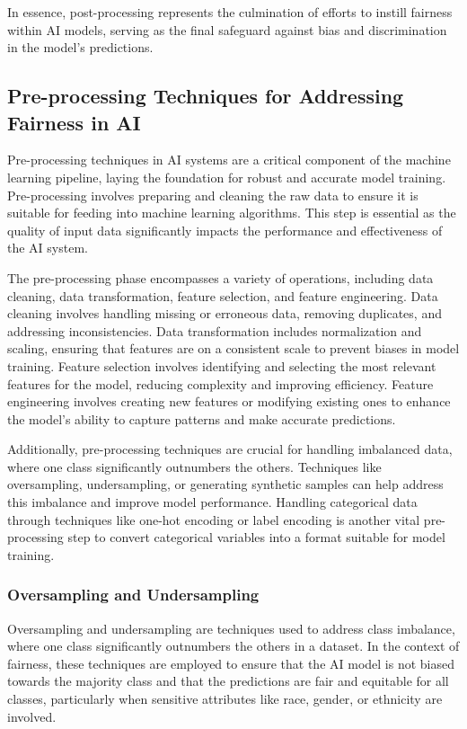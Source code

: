 \documentclass[12pt,a4paper,openright,twoside]{book}
\begin{document}
In essence, post-processing represents the culmination of efforts to instill fairness within AI models, serving as the final safeguard against bias and discrimination in the model's predictions.

\subsection{Pre-processing Techniques for Addressing Fairness in AI}

Pre-processing techniques in AI systems are a critical component of the machine learning pipeline, laying the foundation for robust and accurate model training. Pre-processing involves preparing and cleaning the raw data to ensure it is suitable for feeding into machine learning algorithms. This step is essential as the quality of input data significantly impacts the performance and effectiveness of the AI system. 

The pre-processing phase encompasses a variety of operations, including data cleaning, data transformation, feature selection, and feature engineering. Data cleaning involves handling missing or erroneous data, removing duplicates, and addressing inconsistencies. Data transformation includes normalization and scaling, ensuring that features are on a consistent scale to prevent biases in model training. Feature selection involves identifying and selecting the most relevant features for the model, reducing complexity and improving efficiency. Feature engineering involves creating new features or modifying existing ones to enhance the model's ability to capture patterns and make accurate predictions. 

Additionally, pre-processing techniques are crucial for handling imbalanced data, where one class significantly outnumbers the others. Techniques like oversampling, undersampling, or generating synthetic samples can help address this imbalance and improve model performance. Handling categorical data through techniques like one-hot encoding or label encoding is another vital pre-processing step to convert categorical variables into a format suitable for model training.

\subsubsection{Oversampling and Undersampling}

Oversampling and undersampling are techniques used to address class imbalance, where one class significantly outnumbers the others in a dataset. In the context of fairness, these techniques are employed to ensure that the AI model is not biased towards the majority class and that the predictions are fair and equitable for all classes, particularly when sensitive attributes like race, gender, or ethnicity are involved. \cite{9442706}
\end{document}
